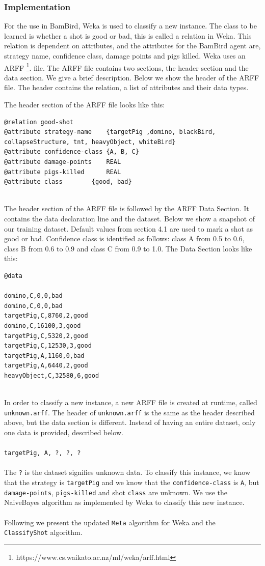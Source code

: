 \subsubsection{Implementation}
For the use in BamBird, Weka is used to classify a new instance. The class to be learned is whether a shot is good or bad, this is called a relation in Weka. This relation is dependent on attributes, and the attributes for the BamBird agent are, strategy name, confidence class, damage points and pigs killed. Weka uses an ARFF \footnote{https://www.cs.waikato.ac.nz/ml/weka/arff.html}. file. The ARFF file contains two sections, the header section and the data section. We give a brief description. Below we show the header of the ARFF file. The header contains the relation, a list of attributes and their data types.

The header section of the ARFF file looks like this:
\begin{lstlisting}
@relation good-shot
@attribute strategy-name 	{targetPig ,domino, blackBird,
collapseStructure, tnt, heavyObject, whiteBird}
@attribute confidence-class	{A, B, C}
@attribute damage-points	REAL
@attribute pigs-killed		REAL
@attribute class		{good, bad}
\end{lstlisting}
\ \\
The header section of the ARFF file is followed by the ARFF Data Section. It contains the data declaration line and the dataset. Below we show a snapshot of our training dataset. Default values from section 4.1 are used to mark a shot as good or bad. Confidence class is identified as follows: class A from 0.5 to 0.6, class B from 0.6 to 0.9 and class C from 0.9 to 1.0. The Data Section looks like this:

\begin{lstlisting}
@data

domino,C,0,0,bad
domino,C,0,0,bad
targetPig,C,8760,2,good
domino,C,16100,3,good
targetPig,C,5320,2,good
targetPig,C,12530,3,good
targetPig,A,1160,0,bad
targetPig,A,6440,2,good
heavyObject,C,32580,6,good
\end{lstlisting}
\ \\
In order to classify a new instance, a new ARFF file is created at runtime, called \texttt{unknown.arff}. The header of \texttt{unknown.arff} is the same as the header described above, but the data section is different. Instead of having an entire dataset, only one data is provided, described below.
\ \\
\ \\
\texttt{targetPig, A, ?, ?, ?}
\ \\
\ \\
The \texttt{?} is the dataset signifies unknown data. To classify this instance, we know that the strategy is \texttt{targetPig} and we know that the \texttt{confidence-class} is \texttt{A}, but \texttt{damage-points}, \texttt{pigs-killed} and shot \texttt{class} are unknown. We use the NaiveBayes algorithm as implemented by Weka to classify this new instance.
\ \\
\ \\
Following we present the updated \texttt{Meta} algorithm for Weka and the \texttt{ClassifyShot} algorithm.

